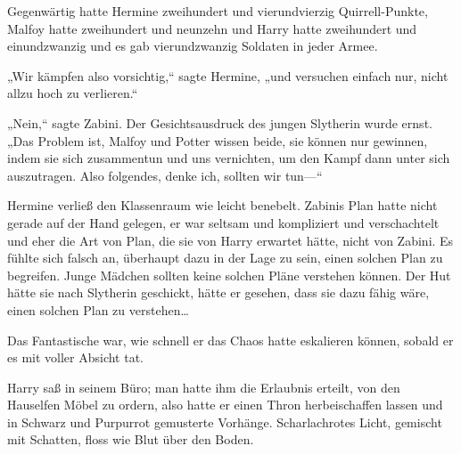 Gegenwärtig hatte Hermine zweihundert und vierundvierzig Quirrell-Punkte, Malfoy hatte zweihundert und neunzehn und Harry hatte zweihundert und einundzwanzig und es gab vierundzwanzig Soldaten in jeder Armee.

„Wir kämpfen also vorsichtig,“ sagte Hermine, „und versuchen einfach nur, nicht allzu hoch zu verlieren.“

„Nein,“ sagte Zabini. Der Gesichtsausdruck des jungen Slytherin wurde ernst. „Das Problem ist, Malfoy und Potter wissen beide, sie können nur gewinnen, indem sie sich zusammentun und uns vernichten, um den Kampf dann unter sich auszutragen. Also folgendes, denke ich, sollten wir tun—“

Hermine verließ den Klassenraum wie leicht benebelt. Zabinis Plan hatte nicht gerade auf der Hand gelegen, er war seltsam und kompliziert und verschachtelt und eher die Art von Plan, die sie von Harry erwartet hätte, nicht von Zabini. Es fühlte sich falsch an, überhaupt dazu in der Lage zu sein, einen solchen Plan zu begreifen. Junge Mädchen sollten keine solchen Pläne verstehen können. Der Hut hätte sie nach Slytherin geschickt, hätte er gesehen, dass sie dazu fähig wäre, einen solchen Plan zu verstehen…

\later

Das Fantastische war, wie schnell er das Chaos hatte eskalieren können, sobald er es mit voller Absicht tat.

Harry saß in seinem Büro; man hatte ihm die Erlaubnis erteilt, von den Hauselfen Möbel zu ordern, also hatte er einen Thron herbeischaffen lassen und in Schwarz und Purpurrot gemusterte Vorhänge. Scharlachrotes Licht, gemischt mit Schatten, floss wie Blut über den Boden.

